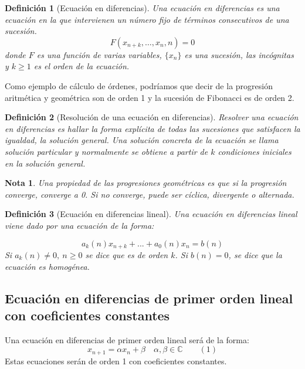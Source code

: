 \documentclass[11pt, a4paper, titlepage]{article}
\theoremstyle{theorem-style}
\theoremstyle{definition-style}
\newtheorem*{ndef}{Definición}
\theoremstyle{remark-style}
\newtheorem*{nota}{Nota}
\theoremstyle{example-style}
\begin{document}
\begin{ndef}[Ecuación en diferencias]
	Una ecuación en diferencias es una ecuación en la que intervienen un número fijo de términos consecutivos de una sucesión.
	\[
	F(x_{n+k},\dots, x_n , n)= 0
	\]
donde $F$ es una función de varias variables, $\{x_n\}$ es una sucesión, las incógnitas y $k \geq 1 $ es el orden de la ecuación.
\end{ndef}

Como ejemplo de cálculo de órdenes, podríamos que decir de la progresión aritmética y geométrica son de orden 1 y la sucesión de Fibonacci es de orden 2.

\begin{ndef}[Resolución de una ecuación en diferencias]
	Resolver una ecuación en diferencias es hallar la forma explícita de todas las sucesiones que satisfacen la igualdad, la solución general. Una solución concreta de la ecuación se llama solución particular y normalmente se obtiene a partir de $k$ condiciones iniciales en la solución general.
\end{ndef}

\begin{nota}
	Una propiedad de las progresiones geométricas es que si la progresión converge, converge a 0. Si no converge, puede ser cíclica, divergente o alternada.
\end{nota}

\begin{ndef}[Ecuación en diferencias lineal]
	Una ecuación en diferencias lineal viene dado por una ecuación de la forma:

\[
a_k(n)x_{n+k} + ... + a_0(n)x_n = b(n)
\]
Si $a_k(n)\ne 0, \ n \geq 0$ se dice que es de orden $k$. Si $b(n) = 0$, se dice que la ecuación es homogénea.
\end{ndef}


\subsection{Ecuación en diferencias de primer orden lineal con coeficientes constantes}

Una ecuación en diferencias de primer orden lineal será de la forma:
\[
x_{n+1} = \alpha x_n +  \beta \quad \alpha,\beta \in \mathbb{C}\quad \quad (1)
\]
Estas ecuaciones serán de orden 1 con coeficientes constantes.
\end{document}
